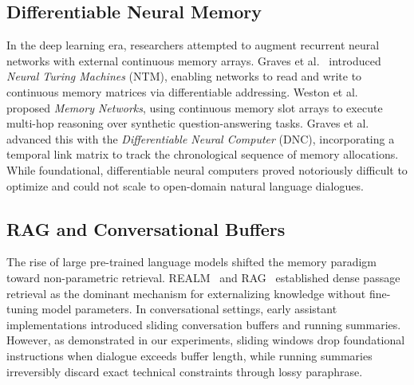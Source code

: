\subsection{Differentiable Neural Memory}
In the deep learning era, researchers attempted to augment recurrent neural networks with external continuous memory arrays. Graves et al.~\cite{graves2014neural} introduced \textit{Neural Turing Machines} (NTM), enabling networks to read and write to continuous memory matrices via differentiable addressing. Weston et al.~\cite{weston2014memory} proposed \textit{Memory Networks}, using continuous memory slot arrays to execute multi-hop reasoning over synthetic question-answering tasks. Graves et al.~\cite{graves2016hybrid} advanced this with the \textit{Differentiable Neural Computer} (DNC), incorporating a temporal link matrix to track the chronological sequence of memory allocations. While foundational, differentiable neural computers proved notoriously difficult to optimize and could not scale to open-domain natural language dialogues.

\subsection{RAG and Conversational Buffers}
The rise of large pre-trained language models shifted the memory paradigm toward non-parametric retrieval. REALM~\cite{guu2020realm} and RAG~\cite{lewis2020retrieval} established dense passage retrieval as the dominant mechanism for externalizing knowledge without fine-tuning model parameters. In conversational settings, early assistant implementations introduced sliding conversation buffers and running summaries. However, as demonstrated in our experiments, sliding windows drop foundational instructions when dialogue exceeds buffer length, while running summaries irreversibly discard exact technical constraints through lossy paraphrase.

